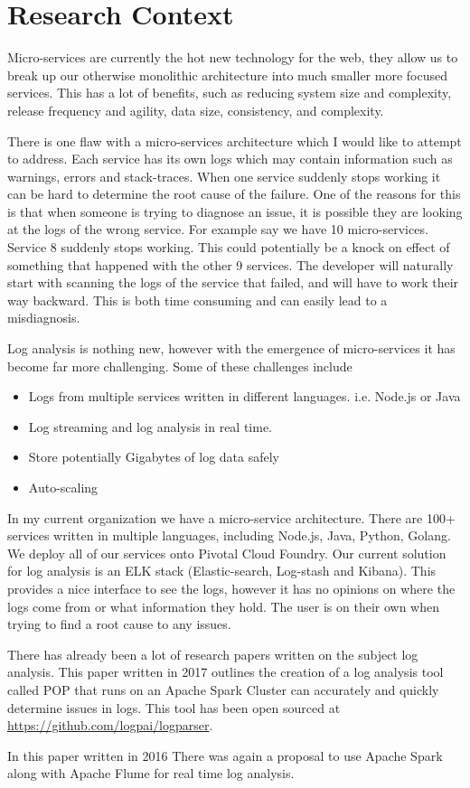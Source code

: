 \chapter{Research Context}
Micro-services are currently the hot new technology for the web, they allow us to break up our otherwise monolithic architecture into much smaller more focused services. This has a lot of benefits, such as reducing system size and complexity, release frequency and agility, data size, consistency, and complexity\cite{7742218}. 

There is one flaw with a micro-services architecture which I would like to attempt to address. Each service has its own logs which may contain information such as warnings, errors and stack-traces. When one service suddenly stops working it can be hard to determine the root cause of the failure. One of the reasons for this is that when someone is trying to diagnose an issue, it is possible they are looking at the logs of the wrong service. For example say we have 10 micro-services. Service 8 suddenly stops working. This could potentially be a knock on effect of something that happened with the other 9 services. The developer will naturally start with scanning the logs of the service that failed, and will have to work their way backward. This is both time consuming and can easily lead to a misdiagnosis.

Log analysis is nothing new, however with the emergence of micro-services it has become far more challenging. Some of these challenges include

\begin{itemize}
  \item Logs from multiple services written in different languages. i.e. Node.js or Java
  \item Log streaming and log analysis in real time. 
  \item Store potentially Gigabytes of log data safely
  \item Auto-scaling
\end{itemize}

In my current organization we have a micro-service architecture. There are 100+ services written in multiple languages, including Node.js, Java, Python, Golang. We deploy all of our services onto Pivotal Cloud Foundry. Our current solution for log analysis is an ELK stack (Elastic-search, Log-stash and Kibana). This provides a nice interface to see the logs, however it has no opinions on where the logs come from or what information they hold. The user is on their own when trying to find a root cause to any issues.

There has already been a lot of research papers written on the subject log analysis. This paper written in 2017\cite{8067504} outlines the creation of a log analysis tool called POP that runs on an Apache Spark Cluster can accurately and quickly determine issues in logs. This tool has been open sourced at \href{https://github.com/logpai/logparser}{https://github.com/logpai/logparser}.

In this paper written in 2016\cite{7748933} There was again a proposal to use Apache Spark  along with Apache Flume for real time log analysis. 